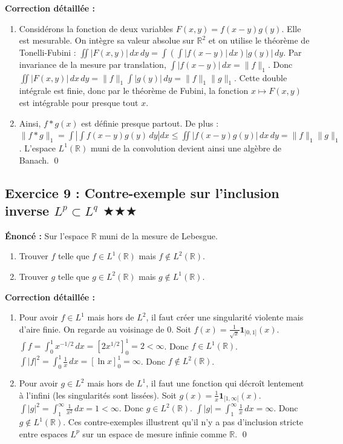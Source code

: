 \documentclass[11pt,a4paper]{article}
\begin{document}
\textbf{Correction détaillée :}
\begin{enumerate}
\item Considérons la fonction de deux variables $F(x,y) = f(x-y)g(y)$. Elle est mesurable.
   On intègre sa valeur absolue sur $\mathbb{R}^2$ et on utilise le théorème de Tonelli-Fubini :
   $\iint |F(x,y)| \, dx \, dy = \int \left( \int |f(x-y)| \, dx \right) |g(y)| \, dy$.
   Par invariance de la mesure par translation, $\int |f(x-y)| \, dx = \|f\|_1$.
   Donc $\iint |F(x,y)| \, dx \, dy = \|f\|_1 \int |g(y)| \, dy = \|f\|_1 \|g\|_1$.
   Cette double intégrale est finie, donc par le théorème de Fubini, la fonction $x \mapsto F(x,y)$ est intégrable pour presque tout $x$.
\item Ainsi, $f * g(x)$ est définie presque partout. De plus :
   $\|f * g\|_1 = \int \left| \int f(x-y)g(y) \, dy \right| dx \le \iint |f(x-y)g(y)| \, dx \, dy = \|f\|_1 \|g\|_1$.
   L'espace $L^1(\mathbb{R})$ muni de la convolution devient ainsi une algèbre de Banach. \qed
\end{enumerate}


\subsection*{Exercice 9 : Contre-exemple sur l'inclusion inverse $L^p \subset L^q$ \quad $\bigstar\bigstar\bigstar$}
\textbf{Énoncé :}
Sur l'espace $\mathbb{R}$ muni de la mesure de Lebesgue.
\begin{enumerate}
\item Trouver $f$ telle que $f \in L^1(\mathbb{R})$ mais $f \notin L^2(\mathbb{R})$.
\item Trouver $g$ telle que $g \in L^2(\mathbb{R})$ mais $g \notin L^1(\mathbb{R})$.
\end{enumerate}

\textbf{Correction détaillée :}
\begin{enumerate}
\item Pour avoir $f \in L^1$ mais hors de $L^2$, il faut créer une singularité violente mais d'aire finie. On regarde au voisinage de 0.
   Soit $f(x) = \frac{1}{\sqrt{x}} \mathbf{1}_{]0, 1]}(x)$.
   $\int f = \int_0^1 x^{-1/2} \, dx = [2x^{1/2}]_0^1 = 2 < \infty$. Donc $f \in L^1(\mathbb{R})$.
   $\int |f|^2 = \int_0^1 \frac{1}{x} \, dx = [\ln x]_0^1 = \infty$. Donc $f \notin L^2(\mathbb{R})$.
\item Pour avoir $g \in L^2$ mais hors de $L^1$, il faut une fonction qui décroît lentement à l'infini (les singularités sont lissées).
   Soit $g(x) = \frac{1}{x} \mathbf{1}_{[1, \infty[}(x)$.
   $\int |g|^2 = \int_1^\infty \frac{1}{x^2} \, dx = 1 < \infty$. Donc $g \in L^2(\mathbb{R})$.
   $\int |g| = \int_1^\infty \frac{1}{x} \, dx = \infty$. Donc $g \notin L^1(\mathbb{R})$.
Ces contre-exemples illustrent qu'il n'y a pas d'inclusion stricte entre espaces $L^p$ sur un espace de mesure infinie comme $\mathbb{R}$. \qed
\end{enumerate}
\end{document}
